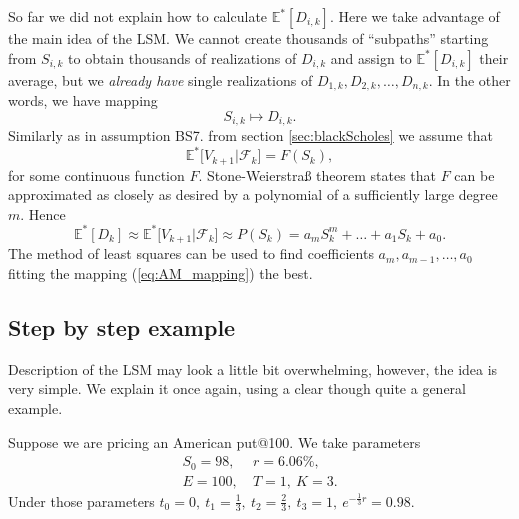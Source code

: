 \documentclass[a4paper,11pt, twoside]{book}
\theoremstyle{definition}
\theoremstyle{remark}
\newcounter{example}[chapter]
\def\Em{{\mathbb{E}^*}}
\begin{document}
So far we did not explain how to calculate $\Em[D_{i,k}]$. Here we take advantage of the main idea of the LSM. We cannot create thousands of ``subpaths'' starting from $S_{i,k}$ to obtain thousands of realizations of $D_{i,k}$ and assign to $\Em[D_{i,k}]$ their average, but we \emph{already have} single realizations of $D_{1,k}, D_{2,k},\ldots, D_{n,k}$. In the other words, we have mapping
\begin{equation}
 \label{eq:AM_mapping}
  S_{i,k} \mapsto D_{i,k}.
\end{equation}
Similarly as in assumption BS7. from section \ref{sec:blackScholes} we assume that
\begin{equation*}
 \Em\bigl[ V_{k+1} | \mathcal{F}_{k} \bigr] = F(S_{k}),
\end{equation*}
for some continuous function $F$. Stone-Weierstra\ss{} theorem states that $F$ can be approximated as closely as desired by a polynomial of a sufficiently large degree $m$. Hence
\begin{equation*}
 \Em[D_{k}] \approx \Em\bigl[ V_{k+1} | \mathcal{F}_{k} \bigr] \approx P(S_{k}) = a_m S_{k}^m + \ldots + a_1 S_{k} + a_0.
\end{equation*}
The method of least squares can be used to find coefficients $a_m, a_{m-1},\ldots,a_0$ fitting the mapping (\ref{eq:AM_mapping}) the best.

\subsection{Step by step example}
Description of the LSM may look a little bit overwhelming, however, the idea is very simple. We explain it once again, using a clear though quite a general example.

Suppose we are pricing an American put@100. We take parameters
\begin{equation*}
\begin{split}
 S_0 = 98,&\ r = 6.06\%,\\
 E = 100,&\ T = 1,\ K = 3. 
\end{split}
\end{equation*}
Under those parameters $t_0 = 0,\ t_1 = \frac{1}{3},\ t_2 = \frac{2}{3},\ t_3 = 1,\ e^{-\frac{1}{3}r} = 0.98$.
\bigskip
\end{document}
